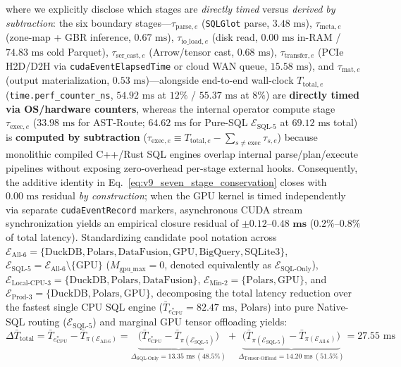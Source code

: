 \documentclass[10pt,a4paper]{article}
\begin{document}
\begin{enumerate}[leftmargin=1.5em,itemsep=0.8pt]
    where we explicitly disclose which stages are \emph{directly timed} versus \emph{derived by subtraction}: the six boundary stages---$\tau_{\text{parse},e}$ (\texttt{SQLGlot} parse, $3.48\text{ ms}$), $\tau_{\text{meta},e}$ (zone-map + GBR inference, $0.67\text{ ms}$), $\tau_{\text{io\_load},e}$ (disk read, $0.00\text{ ms}$ in-RAM / $74.83\text{ ms}$ cold Parquet), $\tau_{\text{ser\_cast},e}$ (Arrow/tensor cast, $0.68\text{ ms}$), $\tau_{\text{transfer},e}$ (PCIe H2D/D2H via \texttt{cudaEventElapsedTime} or cloud WAN queue, $15.58\text{ ms}$), and $\tau_{\text{mat},e}$ (output materialization, $0.53\text{ ms}$)---alongside end-to-end wall-clock $T_{\text{total},e}$ (\texttt{time.perf\_counter\_ns}, $54.92\text{ ms}$ at $12\%$ / $55.37\text{ ms}$ at $8\%$) are \textbf{directly timed via OS/hardware counters}, whereas the internal operator compute stage $\tau_{\text{exec},e}$ ($33.98\text{ ms}$ for AST-Route; $64.62\text{ ms}$ for Pure-SQL $\mathcal{E}_{\text{SQL-5}}$ at $69.12\text{ ms}$ total) is \textbf{computed by subtraction} ($\tau_{\text{exec},e} \equiv T_{\text{total},e} - \sum_{s\neq\text{exec}}\tau_{s,e}$) because monolithic compiled C++/Rust SQL engines overlap internal parse/plan/execute pipelines without exposing zero-overhead per-stage external hooks. Consequently, the additive identity in Eq.~\eqref{eq:v9_seven_stage_conservation} closes with $0.00\text{ ms}$ residual \emph{by construction}; when the GPU kernel is timed independently via separate \texttt{cudaEventRecord} markers, asynchronous CUDA stream synchronization yields an empirical closure residual of $\mathbf{\pm 0.12\text{--}0.48\text{ ms}}$ ($\mathbf{0.2\%\text{--}0.8\%}$ of total latency). Standardizing candidate pool notation across $\mathcal{E}_{\text{All-6}} = \{\text{DuckDB},\text{Polars},\text{DataFusion},\text{GPU},\text{BigQuery},\text{SQLite3}\}$, $\mathcal{E}_{\text{SQL-5}} = \mathcal{E}_{\text{All-6}}\setminus\{\text{GPU}\}$ ($M_{\text{gpu\_max}}=0$, denoted equivalently as $\mathcal{E}_{\text{SQL-Only}}$), $\mathcal{E}_{\text{Local-CPU-3}} = \{\text{DuckDB},\text{Polars},\text{DataFusion}\}$, $\mathcal{E}_{\text{Min-2}} = \{\text{Polars},\text{GPU}\}$, and $\mathcal{E}_{\text{Prod-3}} = \{\text{DuckDB},\text{Polars},\text{GPU}\}$, decomposing the total latency reduction over the fastest single CPU SQL engine ($\bar{T}_{e^*_{\text{CPU}}} = 82.47\text{ ms}$, Polars) into pure Native-SQL routing ($\mathcal{E}_{\text{SQL-5}}$) and marginal GPU tensor offloading yields:
    \begin{equation}\label{eq:v9_sql_vs_tensor_attribution}
        \Delta \bar{T}_{\text{total}} = \bar{T}_{e^*_{\text{CPU}}} - \bar{T}_{\pi(\mathcal{E}_{\text{All-6}})} = \underbrace{\big(\bar{T}_{e^*_{\text{CPU}}} - \bar{T}_{\pi(\mathcal{E}_{\text{SQL-5}})}\big)}_{\Delta_{\text{SQL-Only}} = 13.35\text{ ms}\ (48.5\%)} + \underbrace{\big(\bar{T}_{\pi(\mathcal{E}_{\text{SQL-5}})} - \bar{T}_{\pi(\mathcal{E}_{\text{All-6}})}\big)}_{\Delta_{\text{Tensor-Offload}} = 14.20\text{ ms}\ (51.5\%)} = 27.55\text{ ms}

\end{equation}
\end{enumerate}
\end{document}
